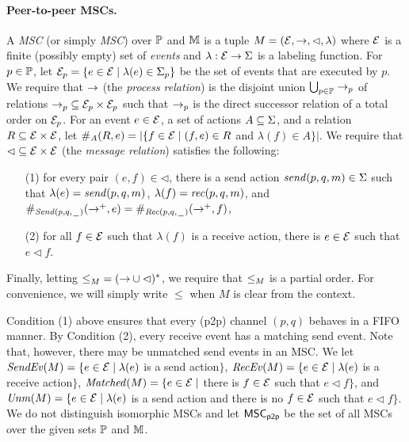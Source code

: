 \documentclass{article}
\begin{document}
\paragraph*{Peer-to-peer MSCs.}
A \emph{\pp MSC} (or simply \emph{MSC}) over $\Procs$ and $\Msg$ is a tuple $\msc = (\Events,\procrel,\lhd,\lambda)$
where $\Events$ is a finite (possibly empty) set of \emph{events}
and $\lambda: \Events \to \Act$ is a labeling function.
For $p \in \Procs$, let $\Events_p = \{e \in \Events \mid \lambda(e) \in \pAct{p}\}$ be the set of events
that are executed by $p$.
We require that $\procrel$ (the \emph{process relation}) is the disjoint union $\bigcup_{p \in \Procs} \procrel_p$
of relations ${\procrel_p} \subseteq \Events_p \times \Events_p$ such that
$\procrel_p$ is the direct successor relation of a total order on $\Events_p$.
For an event $e \in \Events$, a set of actions $A \subseteq \Act$, and a relation $\rel \subseteq \Events \times \Events$,
let $\sametype{e}{A}{\rel} = |\{f \in \Events \mid (f,e) \in \rel$ and $\lambda(f) \in A\}|$.
We require that ${\lhd} \subseteq \Events \times \Events$ (the \emph{message relation}) satisfies the following:
\begin{itemize}\itemsep=0.5ex
\item[(1)] for every pair $(e,f) \in {\lhd}$, there is a send action $\sact{p}{q}{\msg} \in \Act$ such that
$\lambda(e) = \sact{p}{q}{\msg}$, $\lambda(f) = \ract{p}{q}{\msg}$, and
$\sametype{e}{\pqsAct{p}{q}}{\procrel^+} = \sametype{f}{\pqrAct{p}{q}}{\procrel^+}$,
\item[(2)] for all $f \in \Events$ such that $\lambda(f)$ is a receive action, there is $e \in \Events$ such that $e \lhd f$.
\end{itemize}
Finally, letting ${\le}_\msc = ({\procrel} \cup {\lhd})^\ast$,
we require that $\le_\msc$ is a partial order. For convenience, we will simply write $\le$ when $M$ is clear from the context. 

\medskip

Condition (1) above ensures that every (p2p) channel $(p,q)$ behaves in a FIFO manner.
By Condition (2), every receive event has a matching send event.
Note that, however, there may be unmatched send events in an MSC.
We let
$\SendEv{\msc} = \{e \in \Events \mid \lambda(e)$ is a send
action$\}$,
$\RecEv{\msc} = \{e \in \Events \mid \lambda(e)$ is a receive
action$\}$,
$\Matched{\msc} = \{e \in \Events \mid$ there is $f \in \Events$
such that $e \lhd f\}$, and
$\Unm{\msc} = \{e \in \Events \mid \lambda(e)$ is a send
action and there is no $f \in \Events$ such that $e \lhd f\}$.
%
We do not distinguish isomorphic MSCs and
let $\ppMSCs$ be the set of all MSCs over the given sets $\Procs$ and $\Msg$.
\end{document}
